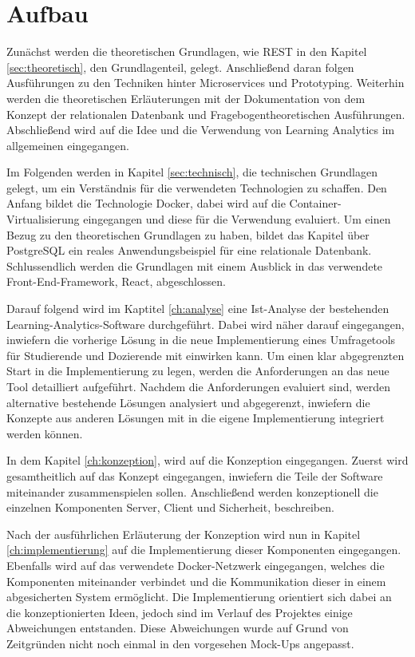 \section{Aufbau}

Zunächst werden die theoretischen Grundlagen, wie \ac{REST} in den Kapitel \vref{sec:theoretisch}, den Grundlagenteil, gelegt.
Anschließend daran folgen Ausführungen zu den Techniken hinter Microservices und Prototyping.
Weiterhin werden die theoretischen Erläuterungen mit der Dokumentation von dem Konzept der relationalen Datenbank und Fragebogentheoretischen Ausführungen. 
Abschließend wird auf die Idee und die Verwendung von Learning Analytics im allgemeinen eingegangen. 

Im Folgenden werden in Kapitel \vref{sec:technisch}, die technischen Grundlagen gelegt, um ein Verständnis für die verwendeten Technologien zu schaffen. 
Den Anfang bildet die Technologie Docker, dabei wird auf die Container-Virtualisierung eingegangen und diese für die Verwendung evaluiert. %
Um einen Bezug zu den theoretischen Grundlagen zu haben, bildet das Kapitel über PostgreSQL ein reales Anwendungsbeispiel für eine relationale Datenbank.  
Schlussendlich werden die Grundlagen mit einem Ausblick in das verwendete Front-End-Framework, React, abgeschlossen. 


Darauf folgend wird im Kaptitel \vref{ch:analyse} eine Ist-Analyse der bestehenden Learning-Analytics-Software durchgeführt. 
Dabei wird näher darauf eingegangen, inwiefern die vorherige Lösung in die neue Implementierung eines Umfragetools für Studierende und Dozierende mit einwirken kann. 
Um einen klar abgegrenzten Start in die Implementierung zu legen, werden die Anforderungen an das neue Tool detailliert aufgeführt. 
Nachdem die Anforderungen evaluiert sind, werden alternative bestehende Lösungen analysiert und abgegerenzt, inwiefern die Konzepte aus anderen Lösungen mit in die eigene Implementierung integriert werden können. 

In dem Kapitel \vref{ch:konzeption}, wird auf die Konzeption eingegangen. 
Zuerst wird gesamtheitlich auf das Konzept eingegangen, inwiefern die Teile der Software miteinander zusammenspielen sollen. 
Anschließend werden konzeptionell die einzelnen Komponenten Server, Client und Sicherheit, beschreiben. 

Nach der ausführlichen Erläuterung der Konzeption wird nun in Kapitel \vref{ch:implementierung} auf die Implementierung dieser Komponenten eingegangen. 
Ebenfalls wird auf das verwendete Docker-Netzwerk eingegangen, welches die Komponenten miteinander verbindet und die Kommunikation dieser in einem abgesicherten System ermöglicht.
Die Implementierung orientiert sich dabei an die konzeptionierten Ideen, jedoch sind im Verlauf des Projektes einige Abweichungen entstanden.
Diese Abweichungen wurde auf Grund von Zeitgründen nicht noch einmal in den vorgesehen Mock-Ups angepasst.

